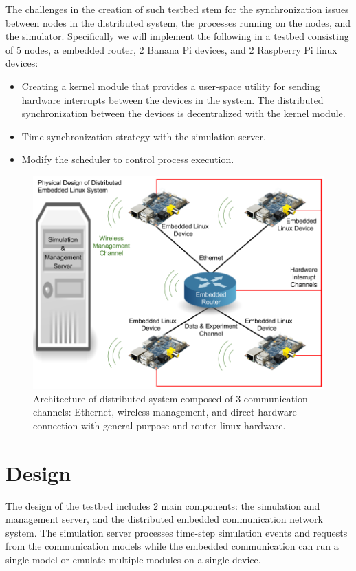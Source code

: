 The challenges in the creation of such testbed stem for the synchronization issues between nodes in the distributed system, the processes running on the nodes, and the simulator. Specifically we will implement the following in a testbed consisting of 5 nodes, a embedded router, 2 Banana Pi devices, and 2 Raspberry Pi linux devices:

\begin{itemize}
\item Creating a kernel module that provides a user-space utility for sending hardware interrupts between the devices in the system.
The distributed synchronization between the devices is decentralized with the kernel module.
  \item Time synchronization strategy with the simulation server.
  \item Modify the scheduler to control process execution.
\end{itemize}

\begin{figure}
  \centering
  \includegraphics[scale=0.28]{Updated_architecture_emb-vt.png}
  \caption{
    Architecture of distributed system composed of 3 communication channels: Ethernet, wireless management, and direct hardware connection with general purpose and router linux hardware.
    }
\end{figure}


\section{Design}
The design of the testbed includes 2 main components: the simulation and management server, and the distributed embedded communication network system. The simulation server processes time-step simulation events and requests from the communication models while the embedded communication can run a single model or emulate multiple modules on a single device.

